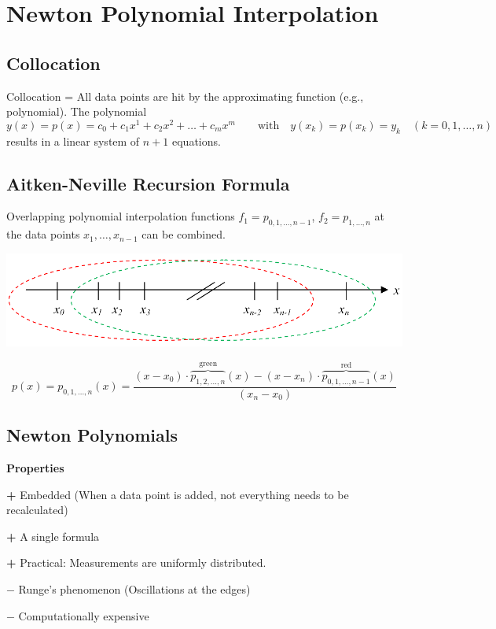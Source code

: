 
\section{Newton Polynomial Interpolation}
\subsection{Collocation}
Collocation = All data points are hit by the approximating function (e.g., polynomial).
The polynomial
\[y(x) = p(x) = c_0 + c_1x^1 + c_2x^2 + \ldots + c_mx^m \qquad \text{with} \quad y(x_k)=p(x_k)=y_k \quad (k=0,1,\ldots,n) \]
results in a linear system of $n+1$ equations.


\subsection{Aitken-Neville Recursion Formula}
Overlapping polynomial interpolation functions
$f_1=p_{0,1,\ldots,n-1}$, $f_2=p_{1,\ldots,n}$ at the data points $x_1,\ldots, x_{n-1}$ can be combined.

\begin{minipage}{8cm}
\includegraphics[width=\textwidth]{bilder/aitkenNevilleIdee}
\end{minipage}
\hfill
\begin{minipage}{11cm}
    \[
        p(x) = p_{0,1,\ldots,n}(x) = \frac{(x-x_0) \cdot \overbrace{p_{1,2,\ldots,n}}^{\text{green}}(x) - (x-x_n) \cdot \overbrace{p_{0,1,\ldots,n-1}}^{\text{red}}(x)}{(x_n - x_0)}
    \]
\end{minipage}

\subsection{Newton Polynomials} \label{ssec:newton_polynom}
\textbf{Properties}
\begin{liste}
	\item[\textbf{+}] Embedded (When a data point is added, not everything needs to be recalculated)
	\item[\textbf{+}] A single formula
	\item[\textbf{+}] Practical: Measurements are uniformly distributed.
	\item[$\mathbf{-}$] Runge's phenomenon (Oscillations at the edges)
	\item[$\mathbf{-}$] Computationally expensive
\end{liste}

